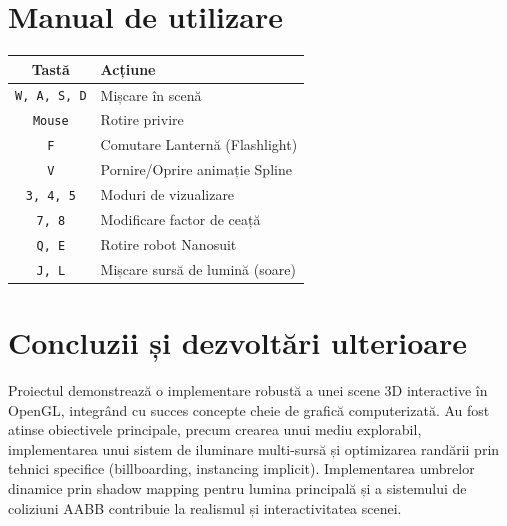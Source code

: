 \documentclass[11pt,a4paper]{article}
\begin{document}
\section{ Manual de utilizare}
\begin{table}[H]
\centering
\begin{tabular}{|c|l|}
\hline
\textbf{Tastă} & \textbf{Acțiune} \\ \hline
\texttt{W, A, S, D} & Mișcare în scenă \\ \hline
\texttt{Mouse} & Rotire privire \\ \hline
\texttt{F} & Comutare Lanternă (Flashlight) \\ \hline
\texttt{V} & Pornire/Oprire animație Spline \\ \hline
\texttt{3, 4, 5} & Moduri de vizualizare \\ \hline
\texttt{7, 8} & Modificare factor de ceață \\ \hline
\texttt{Q, E} & Rotire robot Nanosuit \\ \hline
\texttt{J, L} & Mișcare sursă de lumină (soare) \\ \hline
\end{tabular}
\end{table}

\section{Concluzii și dezvoltări ulterioare}
Proiectul demonstrează o implementare robustă a unei scene 3D interactive în OpenGL, integrând cu succes concepte cheie de grafică computerizată. Au fost atinse obiectivele principale, precum crearea unui mediu explorabil, implementarea unui sistem de iluminare multi-sursă și optimizarea randării prin tehnici specifice (billboarding, instancing implicit). Implementarea umbrelor dinamice prin shadow mapping pentru lumina principală și a sistemului de coliziuni AABB contribuie la realismul și interactivitatea scenei.
\end{document}
